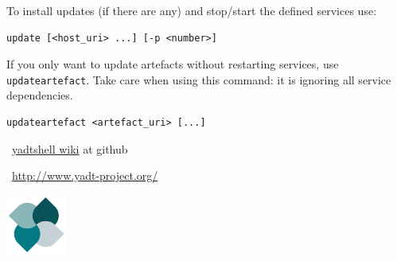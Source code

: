 \documentclass[10pt,landscape]{article}
\begin{document}
\begin{multicols}{3}
To install updates (if there are any) and stop/start the defined services use:
\begin{lstlisting}
update [<host_uri> ...] [-p <number>]
\end{lstlisting}

If you only want to update artefacts without restarting services,
use \verb+updateartefact+. Take care when using this command:
it is ignoring all service dependencies.
\begin{lstlisting}
updateartefact <artefact_uri> [...]
\end{lstlisting}



\begin{minipage}[b]{5cm}
~\hfill\href{https://github.com/yadt/yadtshell/wiki}{yadtshell wiki} at github

~\hfill\href{http://www.yadt-project.org/}{http://www.yadt-project.org/}
\end{minipage}%
\hfill%
\includegraphics[width=2cm,valign=b]{res/yadtlogo}%

\end{multicols}
\end{document}
